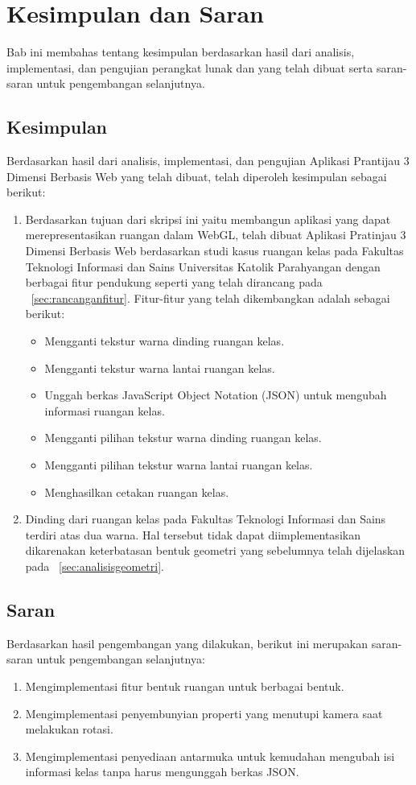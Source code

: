 \chapter{Kesimpulan dan Saran}
Bab ini membahas tentang kesimpulan berdasarkan hasil dari analisis, implementasi, dan pengujian perangkat lunak dan yang telah dibuat serta saran-saran untuk pengembangan selanjutnya.

\section{Kesimpulan}
Berdasarkan hasil dari analisis, implementasi, dan pengujian Aplikasi Prantijau 3 Dimensi Berbasis Web yang telah dibuat, telah diperoleh kesimpulan sebagai berikut:
\begin{enumerate}
	\item Berdasarkan tujuan dari skripsi ini yaitu membangun aplikasi yang dapat merepresentasikan ruangan dalam WebGL, telah dibuat Aplikasi Pratinjau 3 Dimensi Berbasis Web berdasarkan studi kasus ruangan kelas pada Fakultas Teknologi Informasi dan Sains Universitas Katolik Parahyangan dengan berbagai fitur pendukung seperti yang telah dirancang pada ~\ref{sec:rancanganfitur}. Fitur-fitur yang telah dikembangkan adalah sebagai berikut:
	\begin{itemize}
		\item Mengganti tekstur warna dinding ruangan kelas.
		\item Mengganti tekstur warna lantai ruangan kelas.
		\item Unggah berkas JavaScript Object Notation (JSON) untuk mengubah informasi ruangan kelas.
		\item Mengganti pilihan tekstur warna dinding ruangan kelas.
		\item Mengganti pilihan tekstur warna lantai ruangan kelas.
		\item Menghasilkan cetakan ruangan kelas.
	\end{itemize}
	\item Dinding dari ruangan kelas pada Fakultas Teknologi Informasi dan Sains terdiri atas dua warna. Hal tersebut tidak dapat diimplementasikan dikarenakan keterbatasan bentuk geometri yang sebelumnya telah dijelaskan pada ~\ref{sec:analisisgeometri}.
\end{enumerate}

\section{Saran}
Berdasarkan hasil pengembangan yang dilakukan, berikut ini merupakan saran-saran untuk pengembangan selanjutnya:
\begin{enumerate}
	\item Mengimplementasi fitur bentuk ruangan untuk berbagai bentuk.
	\item Mengimplementasi penyembunyian properti yang menutupi kamera saat melakukan rotasi.
	\item Mengimplementasi penyediaan antarmuka untuk kemudahan mengubah isi informasi kelas tanpa harus mengunggah berkas JSON.
\end{enumerate}